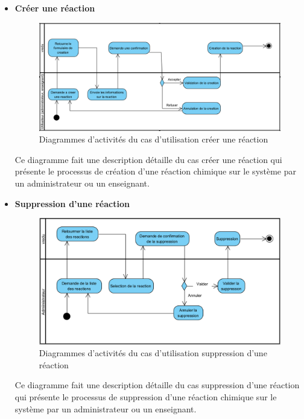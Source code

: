\begin{itemize}
	\item \textbf{Créer une réaction }

	      \begin{figure}[H]
		      \centering
		      \includegraphics[width=1\textwidth]{img/sdCUR}
		      \caption{Diagrammes d’activités du cas d'utilisation créer une réaction}
		      \label{fig:mesh1}
	      \end{figure}

	      Ce diagramme fait une description détaille du cas créer une réaction qui présente le processus de création d’une réaction chimique sur le système par un administrateur ou un enseignant.

	\item \textbf{Suppression d’une réaction}

	      \begin{figure}[H]
		      \centering
		      \includegraphics[width=1\textwidth]{img/adsr}
		      \caption{Diagrammes d’activités du cas d'utilisation suppression d’une réaction}
		      \label{fig:mesh1}
	      \end{figure}

	      Ce diagramme fait une description détaille du cas suppression d’une réaction qui présente le processus de suppression d’une réaction chimique sur le système par un administrateur ou un enseignant.
\end{itemize}

